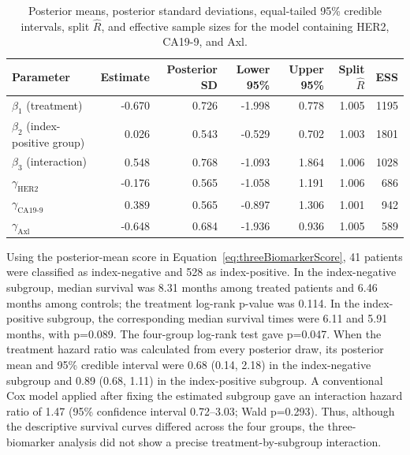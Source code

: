\begin{table}[!htbp]
\caption[Posterior estimates for the three-biomarker analysis]{Posterior means,
posterior standard deviations, equal-tailed 95\% credible intervals, split
$\widehat R$, and effective sample sizes for the model containing HER2,
CA19-9, and Axl.}
\label{tab:analysisEst}
\centering
\scriptsize
\begin{tabular}{lrrrrrr}
\toprule
Parameter & Estimate & Posterior SD & Lower 95\% & Upper 95\% & Split $\widehat R$ & ESS \\
\midrule
$\beta_1$ (treatment)             & -0.670 & 0.726 & -1.998 & 0.778 & 1.005 & 1195 \\
$\beta_2$ (index-positive group)  &  0.026 & 0.543 & -0.529 & 0.702 & 1.003 & 1801 \\
$\beta_3$ (interaction)           &  0.548 & 0.768 & -1.093 & 1.864 & 1.006 & 1028 \\
$\gamma_{\mathrm{HER2}}$          & -0.176 & 0.565 & -1.058 & 1.191 & 1.006 & 686 \\
$\gamma_{\mathrm{CA19\mbox{-}9}}$&  0.389 & 0.565 & -0.897 & 1.306 & 1.001 & 942 \\
$\gamma_{\mathrm{Axl}}$           & -0.648 & 0.684 & -1.936 & 0.936 & 1.005 & 589 \\
\bottomrule
\end{tabular}
\end{table}

Using the posterior-mean score in Equation~\ref{eq:threeBiomarkerScore}, 41
patients were classified as index-negative and 528 as index-positive. In the
index-negative subgroup, median survival was 8.31 months among treated
patients and 6.46 months among controls; the treatment log-rank p-value was
0.114. In the index-positive subgroup, the corresponding median survival
times were 6.11 and 5.91 months, with p=0.089. The four-group log-rank test
gave p=0.047. When the treatment hazard ratio was calculated from every
posterior draw, its posterior mean and 95\% credible interval were 0.68
(0.14, 2.18) in the index-negative subgroup and 0.89 (0.68, 1.11) in the
index-positive subgroup. A conventional Cox model applied after fixing the
estimated subgroup gave an interaction hazard ratio of 1.47 (95\% confidence
interval 0.72--3.03; Wald p=0.293). Thus, although the descriptive survival
curves differed across the four groups, the three-biomarker analysis did not
show a precise treatment-by-subgroup interaction.

